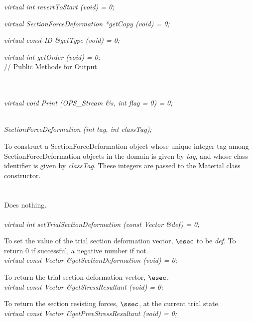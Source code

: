 {\em virtual int revertToStart (void) = 0; } 

{\em virtual SectionForceDeformation *getCopy (void) = 0; } 

{\em virtual const ID \&getType (void) = 0; } 

{\em virtual int getOrder (void) = 0; } \\ 

// Public Methods for Output

\\
\\
{\em virtual void Print (OPS_Stream \&s, int flag = 0) = 0;} 


  \\
{\em SectionForceDeformation (int tag, int classTag);}  

To construct a SectionForceDeformation object whose unique integer tag among
SectionForceDeformation objects in the domain is given by {\em tag}, and whose class
identifier is given by {\em classTag}. These integers are passed to
the Material class constructor. \\

 \\
\\ 
Does nothing. \\

 \\
{\em virtual int setTrialSectionDeformation (const Vector \&def) = 0; }  

To set the value of the trial section deformation vector, $\esec$ to be {\em
def}. To return $0$ if successful, a negative number if not.\\

{\em virtual const Vector \&getSectionDeformation (void) = 0; } 

To return the trial section deformation vector, $\esec$. \\

{\em virtual const Vector \&getStressResultant (void) = 0; } 

To return the section resisting forces, $\ssec$, at the current trial state. \\

{\em virtual const Vector \&getPrevStressResultant (void) = 0; } 

